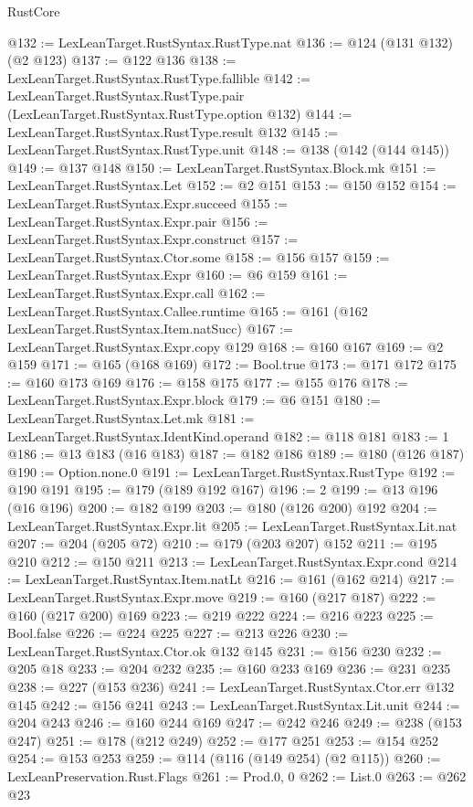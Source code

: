 \begin{lexlean}{RustCore}
\begin{coremodule}
{\begin{coremodule}
{{{{{@132 := LexLeanTarget.RustSyntax.RustType.nat
@136 := @124 (@131 @132) (@2 @123)
@137 := @122 @136
@138 := LexLeanTarget.RustSyntax.RustType.fallible
@142 := LexLeanTarget.RustSyntax.RustType.pair (LexLeanTarget.RustSyntax.RustType.option @132)
@144 := LexLeanTarget.RustSyntax.RustType.result @132
@145 := LexLeanTarget.RustSyntax.RustType.unit
@148 := @138 (@142 (@144 @145))
@149 := @137 @148
@150 := LexLeanTarget.RustSyntax.Block.mk
@151 := LexLeanTarget.RustSyntax.Let
@152 := @2 @151
@153 := @150 @152
@154 := LexLeanTarget.RustSyntax.Expr.succeed
@155 := LexLeanTarget.RustSyntax.Expr.pair
@156 := LexLeanTarget.RustSyntax.Expr.construct
@157 := LexLeanTarget.RustSyntax.Ctor.some
@158 := @156 @157
@159 := LexLeanTarget.RustSyntax.Expr
@160 := @6 @159
@161 := LexLeanTarget.RustSyntax.Expr.call
@162 := LexLeanTarget.RustSyntax.Callee.runtime
@165 := @161 (@162 LexLeanTarget.RustSyntax.Item.natSucc)
@167 := LexLeanTarget.RustSyntax.Expr.copy @129
@168 := @160 @167
@169 := @2 @159
@171 := @165 (@168 @169)
@172 := Bool.true
@173 := @171 @172
@175 := @160 @173 @169
@176 := @158 @175
@177 := @155 @176
@178 := LexLeanTarget.RustSyntax.Expr.block
@179 := @6 @151
@180 := LexLeanTarget.RustSyntax.Let.mk
@181 := LexLeanTarget.RustSyntax.IdentKind.operand
@182 := @118 @181
@183 := 1
@186 := @13 @183 (@16 @183)
@187 := @182 @186
@189 := @180 (@126 @187)
@190 := Option.none.{0}
@191 := LexLeanTarget.RustSyntax.RustType
@192 := @190 @191
@195 := @179 (@189 @192 @167)
@196 := 2
@199 := @13 @196 (@16 @196)
@200 := @182 @199
@203 := @180 (@126 @200) @192
@204 := LexLeanTarget.RustSyntax.Expr.lit
@205 := LexLeanTarget.RustSyntax.Lit.nat
@207 := @204 (@205 @72)
@210 := @179 (@203 @207) @152
@211 := @195 @210
@212 := @150 @211
@213 := LexLeanTarget.RustSyntax.Expr.cond
@214 := LexLeanTarget.RustSyntax.Item.natLt
@216 := @161 (@162 @214)
@217 := LexLeanTarget.RustSyntax.Expr.move
@219 := @160 (@217 @187)
@222 := @160 (@217 @200) @169
@223 := @219 @222
@224 := @216 @223
@225 := Bool.false
@226 := @224 @225
@227 := @213 @226
@230 := LexLeanTarget.RustSyntax.Ctor.ok @132 @145
@231 := @156 @230
@232 := @205 @18
@233 := @204 @232
@235 := @160 @233 @169
@236 := @231 @235
@238 := @227 (@153 @236)
@241 := LexLeanTarget.RustSyntax.Ctor.err @132 @145
@242 := @156 @241
@243 := LexLeanTarget.RustSyntax.Lit.unit
@244 := @204 @243
@246 := @160 @244 @169
@247 := @242 @246
@249 := @238 (@153 @247)
@251 := @178 (@212 @249)
@252 := @177 @251
@253 := @154 @252
@254 := @153 @253
@259 := @114 (@116 (@149 @254) (@2 @115))
@260 := LexLeanPreservation.Rust.Flags
@261 := Prod.{0, 0}
@262 := List.{0}
@263 := @262 @23
}}}}}
\end{coremodule}}
\end{coremodule}
\end{lexlean}
